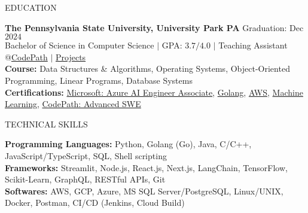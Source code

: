 \documentclass{resume} %
\begin{document}

\begin{rSection}{EDUCATION}

{\bf The Pennsylvania State University, University Park PA} \hfill {Graduation: Dec $2024$}\\
{Bachelor of Science in Computer Science} $\vert$ GPA: $3.7/4.0$ $\vert$ Teaching Assistant @\href{https://www.codepath.org/en-us/volunteers/technical-interview-coaching}{CodePath} $\vert$ \href{https://www.linkedin.com/in/harshitjain17/details/projects/}{Projects}\\
{\bf Course:} Data Structures \& Algorithms, Operating Systems, Object-Oriented Programming, Linear Programs, Database Systems \\
{\bf Certifications:} \href{https://learn.microsoft.com/api/credentials/share/en-us/harshitjain17/36D25FDF9BE21293?sharingId=87F1F438F3879B8C}{Microsoft: Azure AI Engineer Associate}, \href{https://www.udemy.com/certificate/UC-560b1de1-cd58-4384-aded-83b8a5bcb94e}{Golang}, \href{https://www.coursera.org/account/accomplishments/verify/7L8L8YQTMCPZ}{AWS}, \href{https://www.coursera.org/account/accomplishments/verify/JYX5UB5YP4YD}{Machine Learning}, \href{https://www.linkedin.com/in/harshitjain17/details/education/}{CodePath: Advanced SWE}
\end{rSection}


\begin{rSection}{TECHNICAL SKILLS}

{\bf Programming Languages:} Python, Golang (Go), Java, C/C++, JavaScript/TypeScript, SQL, Shell scripting\\
{\bf Frameworks:} Streamlit, Node.js, React.js, Next.js, LangChain, TensorFlow, Scikit-Learn, GraphQL, RESTful APIs, Git\\
{\bf Softwares:} AWS, GCP, Azure, MS SQL Server/PostgreSQL, Linux/UNIX, Docker, Postman, CI/CD (Jenkins, Cloud Build)

\end{rSection}

\end{document}
